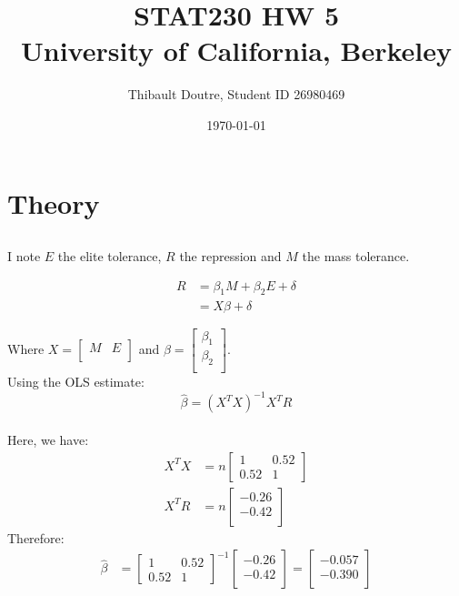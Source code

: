 \documentclass[11pt]{article}\usepackage[]{graphicx}\usepackage[]{color}
\author{Thibault Doutre, Student ID 26980469}
\title{STAT230 HW 5 \\
University of California, Berkeley}
\date{\today}
\begin{document}
\maketitle

\section{Theory}
\subsection{}
I note $E$ the elite tolerance, $R$ the repression and $M$ the mass tolerance. 

\begin{align}
R &= \beta_1 M + \beta_2 E+ \delta \\
&= X \beta+\delta
\end{align}

Where $X = \begin{bmatrix} M&E\\ \end{bmatrix}$ and $\beta = \begin{bmatrix} \beta_1 \\ \beta_2 \\ \end{bmatrix}$.\\
Using the OLS estimate:
\begin{equation}
\hat{\beta}=(X^TX)^{-1}X^TR
\end{equation}\\
Here, we have:
\begin{align}
X^TX &= n\begin{bmatrix} 1&0.52\\ 0.52&1 \end{bmatrix} \\
X^TR &= n\begin{bmatrix} -0.26\\-0.42\\ \end{bmatrix}
\end{align}
Therefore:
\begin{align}
\hat{\beta} &= \begin{bmatrix} 1&0.52\\ 0.52&1 \end{bmatrix}^{-1}\begin{bmatrix} -0.26\\-0.42\\ \end{bmatrix} = \begin{bmatrix} -0.057\\-0.390\\ \end{bmatrix}
\end{align}
\end{document}
